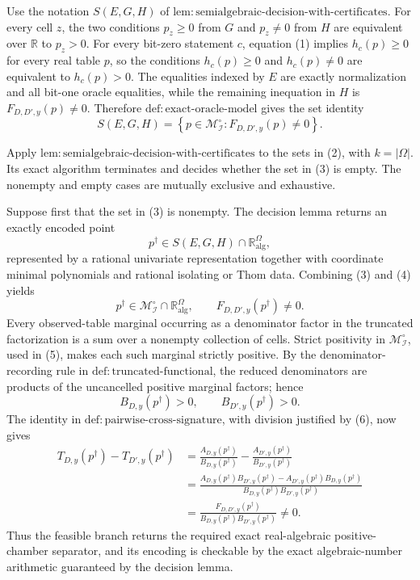 Use the notation \(S(E,G,H)\) of \(\mathrm{lem{:}semialgebraic\text{-}decision\text{-}with\text{-}certificates}\).  For every cell \(z\), the two conditions \(p_z\geq0\) from \(G\) and \(p_z\neq0\) from \(H\) are equivalent over \(\mathbb R\) to \(p_z>0\).  For every bit-zero statement \(c\), equation (1) implies \(h_c(p)\geq0\) for every real table \(p\), so the conditions \(h_c(p)\geq0\) and \(h_c(p)\neq0\) are equivalent to \(h_c(p)>0\).  The equalities indexed by \(E\) are exactly normalization and all bit-one oracle equalities, while the remaining inequation in \(H\) is \(F_{D,D',y}(p)\neq0\).  Therefore \(\mathrm{def{:}exact\text{-}oracle\text{-}model}\) gives the set identity
\[
 S(E,G,H)
 =\left\{p\in\mathcal M_{\mathcal I}^{\circ}:
 F_{D,D',y}(p)\neq0\right\}.
\tag{3}
\]

Apply \(\mathrm{lem{:}semialgebraic\text{-}decision\text{-}with\text{-}certificates}\) to the sets in (2), with \(k=|\Omega|\).  Its exact algorithm terminates and decides whether the set in (3) is empty.  The nonempty and empty cases are mutually exclusive and exhaustive.

Suppose first that the set in (3) is nonempty.  The decision lemma returns an exactly encoded point
\[
 p^\dagger\in S(E,G,H)\cap\mathbb R_{\mathrm{alg}}^\Omega,
\tag{4}
\]
represented by a rational univariate representation together with coordinate minimal polynomials and rational isolating or Thom data.  Combining (3) and (4) yields
\[
 p^\dagger\in\mathcal M_{\mathcal I}^{\circ}
 \cap\mathbb R_{\mathrm{alg}}^\Omega,
 \qquad
 F_{D,D',y}(p^\dagger)\neq0.
\tag{5}
\]
Every observed-table marginal occurring as a denominator factor in the truncated factorization is a sum over a nonempty collection of cells.  Strict positivity in \(\mathcal M_{\mathcal I}^{\circ}\), used in (5), makes each such marginal strictly positive.  By the denominator-recording rule in \(\mathrm{def{:}truncated\text{-}functional}\), the reduced denominators are products of the uncancelled positive marginal factors; hence
\[
 B_{D,y}(p^\dagger)>0,
 \qquad
 B_{D',y}(p^\dagger)>0.
\tag{6}
\]
The identity in \(\mathrm{def{:}pairwise\text{-}cross\text{-}signature}\), with division justified by (6), now gives
\[
 \begin{aligned}
 T_{D,y}(p^\dagger)-T_{D',y}(p^\dagger)
 &=\frac{A_{D,y}(p^\dagger)}{B_{D,y}(p^\dagger)}
   -\frac{A_{D',y}(p^\dagger)}{B_{D',y}(p^\dagger)}\\
 &=\frac{A_{D,y}(p^\dagger)B_{D',y}(p^\dagger)
          -A_{D',y}(p^\dagger)B_{D,y}(p^\dagger)}
         {B_{D,y}(p^\dagger)B_{D',y}(p^\dagger)}\\
 &=\frac{F_{D,D',y}(p^\dagger)}
         {B_{D,y}(p^\dagger)B_{D',y}(p^\dagger)}\neq0.
 \end{aligned}
\tag{7}
\]
Thus the feasible branch returns the required exact real-algebraic positive-chamber separator, and its encoding is checkable by the exact algebraic-number arithmetic guaranteed by the decision lemma.

